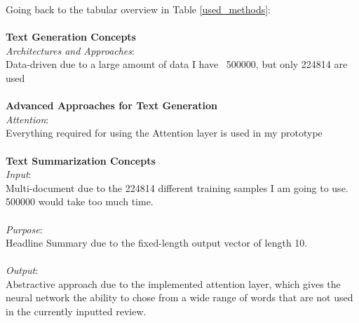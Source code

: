 \begin{tcolorbox}
	Going back to the tabular overview in Table \ref{used_methods}:\\\\
	\textbf{Text Generation Concepts} \\
	
	\textit{Architectures and Approaches}:\\ Data-driven due to a large amount of data I have ~500000, but only 224814 are used \\ \\
	
	\textbf{Advanced Approaches for Text Generation} \\
	
	\textit{Attention}: \\Everything required for using the Attention layer is used in my prototype\\ \\
	
	\textbf{Text Summarization Concepts} \\
	
	\textit{Input}: \\ Multi-document due to the 224814 different training samples I am going to use. 500000 would take too much time. \\ \\
	\textit{Purpose}:\\ Headline Summary due to the fixed-length output vector of length 10. \\ \\
	\textit{Output}: \\ Abstractive approach due to the implemented attention layer, which gives the neural network the ability to chose from a wide range of words that are not used in the currently inputted review.
\end{tcolorbox}

\newpage

